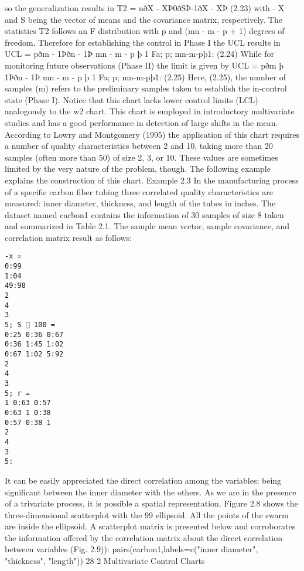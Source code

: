 \documentclass[a4paper,12pt]{article}
\begin{document}
so the generalization results in
T2 = nðX - XÞ0ðSÞ-1ðX - XÞ (2.23)
with - X and S being the vector of means and the covariance matrix, respectively.
The statistics T2 follows an F distribution with p and (mn - m - p + 1) degrees
of freedom. Therefore for establishing the control in Phase I the UCL results in
UCL = pðm - 1Þðn - 1Þ
mn - m - p þ 1
Fa; p; mn-m-pþ1: (2.24)
While for monitoring future observations (Phase II) the limit is given by
UCL = pðm þ 1Þðn - 1Þ
mn - m - p þ 1
Fa; p; mn-m-pþ1: (2.25)
Here, (2.25), the number of samples (m) refers to the preliminary samples taken
to establish the in-control state (Phase I). Notice that this chart lacks lower control
limits (LCL) analogously to the w2 chart.
This chart is employed in introductory multivariate studies and has a good
performance in detection of large shifts in the mean.
According to Lowry and Montgomery (1995) the application of this chart
requires a number of quality characteristics between 2 and 10, taking more than
20 samples (often more than 50) of size 2, 3, or 10. These values are sometimes
limited by the very nature of the problem, though.
The following example explains the construction of this chart.
Example 2.3
In the manufacturing process of a specific carbon fiber tubing three correlated
quality characteristics are measured: inner diameter, thickness, and length of the
tubes in inches. The dataset named carbon1 contains the information of 30 samples
of size 8 taken and summarized in Table 2.1.
The sample mean vector, sample covariance, and correlation matrix result as
follows:
\begin{verbatim}
-x =
0:99
1:04
49:98
2
4
3
5; S  100 =
0:25 0:36 0:67
0:36 1:45 1:02
0:67 1:02 5:92
2
4
3
5; r =
1 0:63 0:57
0:63 1 0:38
0:57 0:38 1
2
4
3
5:
\end{verbatim}
It can be easily appreciated the direct correlation among the variables; being
significant between the inner diameter with the others.
As we are in the presence of a trivariate process, it is possible a spatial
representation. Figure 2.8 shows the three-dimensional scatterplot with the 99%
ellipsoid. All the points of the swarm are inside the ellipsoid.
A scatterplot matrix is presented below and corroborates the information offered
by the correlation matrix about the direct correlation between variables (Fig. 2.9)):
pairs(carbon1,labels=c("inner diameter", "thickness", "length"))
28 2 Multivariate Control Charts
\end{document}
